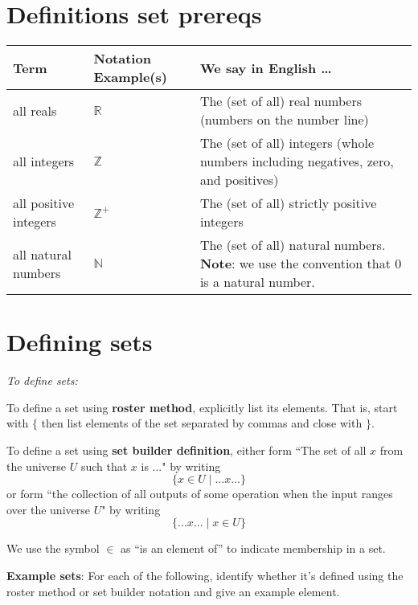 \documentclass[12pt, oneside]{article}
\begin{document}
\begin{flushright}
\end{flushright} \section*{Definitions set prereqs}


\begin{center}
\begin{tabular}{|llp{9.8cm}|}
\hline
{\bf Term} & {\bf Notation Example(s)} & {\bf We say in English \ldots } \\
\hline
all reals & $\mathbb{R}$ & The (set of all) real numbers (numbers on the number line)\\
all integers & $\mathbb{Z}$ & The (set of all) integers (whole numbers including negatives, zero, and positives) \\
all positive integers & $\mathbb{Z}^+$ & The (set of all) strictly positive integers \\
all natural numbers & $\mathbb{N}$ & The (set of all) natural numbers. {\bf Note}: we use the convention that $0$ is a natural number. \\


\hline
\end{tabular}
\end{center} \vfill
\section*{Defining sets}


{\it To define sets:}

To define a set using {\bf roster method}, explicitly list its elements. That is,
start with $\{$ then list elements of 
the set separated by commas and close with $\}$.

\vfill

To define a set using {\bf set builder definition}, either form 
``The set of all $x$ from the universe $U$ such that $x$ is ..." by writing
\[\{x \in U \mid ...x... \}\]
or form ``the collection of all outputs of some operation when the input ranges over the universe $U$"
by writing
\[\{ ...x... \mid x\in U \}\]

\vfill

We use the symbol $\in$ as ``is an element of'' to indicate membership in a set.\\

\newpage 

{\bf Example sets}: For each of the following, identify whether it's defined using the roster method
or set builder notation and give an example element.
\end{document}
